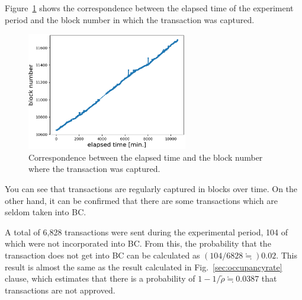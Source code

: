 \documentclass[graybox]{svmult}
\begin{document}
Figure~\ref{fig:exp3-1} shows the correspondence between the elapsed time of the experiment period and the block number in which the transaction was captured. 
%
\begin{figure}[tb]
  \begin{center}
    \includegraphics[width=70mm]{exp3-1.eps}
  \end{center}
  \caption{Correspondence between the elapsed time and the block number where the transaction was captured.}
  \label{fig:exp3-1}
\end{figure}
%
You can see that transactions are regularly captured in blocks over time.
On the other hand, it can be confirmed that there are some transactions which are seldom taken into BC.


A total of 6,828 transactions were sent during the experimental period, 104 of which were not incorporated into BC.
From this, the probability that the transaction does not get into BC can be calculated as $(104/6828 \fallingdotseq) 0.02$.
This result is almost the same as the result calculated in Fig.~\ref{sec:occupancyrate} clause, which estimates that there is a probability of $1 -1 / \tilde{\rho} \fallingdotseq 0.0387$ that transactions are not approved. 
\end{document}
